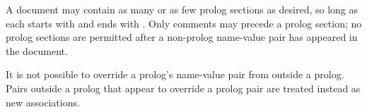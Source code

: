 \documentclass{memarticle}
\begin{document}
A document may contain
as many or as few prolog sections as desired,
so long as each starts with 
and ends with .
Only comments may precede
a prolog section;
no prolog sections are permitted
after a non-prolog name-value pair has appeared
in the document.

It is not possible to override
a prolog's name-value pair
from outside a prolog.
Pairs outside a prolog
that appear to override a prolog pair
are treated instead as new associations.









\end{document}
